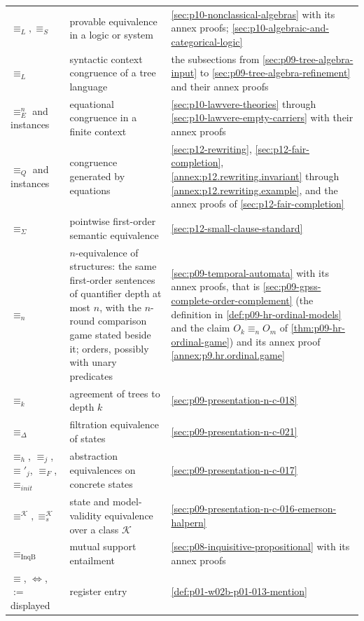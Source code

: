 \begin{longtable}{@{}p{}p{}p{}@{}}
\(\equiv_L,\equiv_S\) & provable equivalence in a logic or system &
\cref{sec:p10-nonclassical-algebras} with its annex proofs;
\cref{sec:p10-algebraic-and-categorical-logic} \\
\(\equiv_L\) & syntactic context congruence of a tree language &
the subsections from \cref{sec:p09-tree-algebra-input} to
\cref{sec:p09-tree-algebra-refinement} and their annex proofs \\
\(\equiv_E^n\) and instances & equational congruence in a finite context &
\cref{sec:p10-lawvere-theories} through \cref{sec:p10-lawvere-empty-carriers}
with their annex proofs \\
\(\equiv_Q\) and instances & congruence generated by equations &
\cref{sec:p12-rewriting}, \cref{sec:p12-fair-completion},
\cref{annex:p12.rewriting.invariant} through
\cref{annex:p12.rewriting.example}, and the annex proofs of
\cref{sec:p12-fair-completion} \\
\(\equiv_\Sigma\) & pointwise first-order semantic equivalence &
\cref{sec:p12-small-clause-standard} \\
\(\equiv_n\) & \(n\)-equivalence of structures: the same first-order
sentences of quantifier depth at most \(n\), with the \(n\)-round
comparison game stated beside it; orders, possibly with unary predicates &
\cref{sec:p09-temporal-automata} with its annex proofs, that is
\cref{sec:p09-gpss-complete-order-complement} (the definition in
\cref{def:p09-hr-ordinal-models} and the claim
\(O_k\equiv_n O_m\) of \cref{thm:p09-hr-ordinal-game}) and its annex proof
\cref{annex:p9.hr.ordinal.game} \\
\(\equiv_k\) & agreement of trees to depth \(k\) &
\cref{sec:p09-presentation-n-c-018} \\
\(\equiv_{\Delta}\) & filtration equivalence of states &
\cref{sec:p09-presentation-n-c-021} \\
\(\equiv_h\), \(\equiv_j\), \(\equiv'_j\), \(\equiv_F\), \(\equiv_{init}\) &
abstraction equivalences on concrete states &
\cref{sec:p09-presentation-n-c-017} \\
\(\equiv^{\mathcal K},\equiv_s^{\mathcal K}\) & state and model-validity
equivalence over a class \(\mathcal K\) &
\cref{sec:p09-presentation-n-c-016-emerson-halpern} \\
\(\equiv_{\mathrm{InqB}}\) & mutual support entailment &
\cref{sec:p08-inquisitive-propositional} with its annex proofs \\
\(\equiv\), \(\Leftrightarrow\), \(:=\) displayed & register entry &
\cref{def:p01-w02b-p01-013-mention} \\
\bottomrule
\end{longtable}
\endgroup

